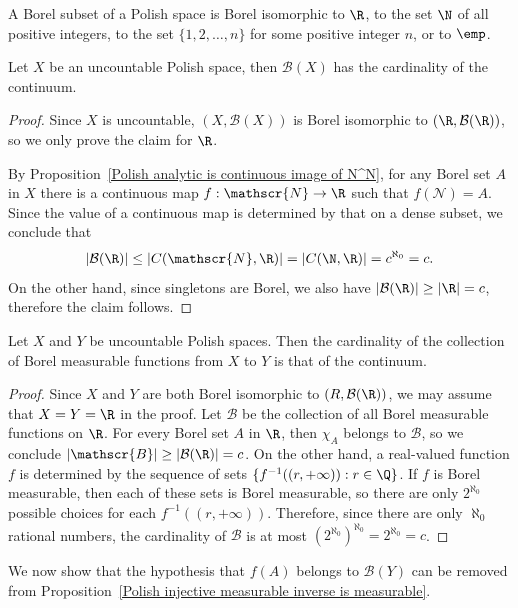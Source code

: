\begin{corollary}\label{Polish Borel set classification}
A Borel subset of a Polish space is Borel isomorphic to $\R$, to the set $\N$ of all positive integers, to the set $\{1,2,\dots,n\}$ for some positive integer $n$, or to $\emp$.
\end{corollary}
\begin{corollary}\label{Polish Borel algebra card}
Let $X$ be an uncountable Polish space, then $\mathcal{B}(X)$ has the cardinality of the continuum.
\end{corollary}
\begin{proof}
Since $X$ is uncountable, $(X,\mathcal{B}(X))$ is Borel isomorphic to $(\R,\mathcal{B}(\R))$, so we only prove the claim for $\R$.\par
By Proposition~\ref{Polish analytic is continuous image of N^N}, for any Borel set $A$ in $X$ there is a continuous map $f:\mathscr{N}\to\R$ such that $f(\mathscr{N})=A$. Since the value of a continuous map is determined by that on a dense subset, we conclude that
\[|\mathcal{B}(\R)|\leq|C(\mathscr{N},\R)|=|C(\N,\R)|=c^{\aleph_0}=c.\]
On the other hand, since singletons are Borel, we also have $|\mathcal{B}(\R)|\geq|\R|=c$, therefore the claim follows.
\end{proof}
\begin{corollary}\label{Polish uncountable spaces Borel measurable function card}
Let $X$ and $Y$ be uncountable Polish spaces. Then the cardinality of the collection of Borel measurable functions from $X$ to $Y$ is that of the continuum.
\end{corollary}
\begin{proof}
Since $X$ and $Y$ are both Borel isomorphic to $(R,\mathcal{B}(\R))$, we may assume that $X=Y=\R$ in the proof. Let $\mathscr{B}$ be the collection of all Borel measurable functions on $\R$. For every Borel set $A$ in $\R$, then $\chi_A$ belongs to $\mathscr{B}$, so we conclude $|\mathscr{B}|\geq|\mathcal{B}(\R)|=c$. On the other hand, a real-valued function $f$ is determined by the sequence of sets $\{f^{-1}((r,+\infty)):r\in\Q\}$. If $f$ is Borel measurable, then each of these sets is Borel measurable, so there are only $2^{\aleph_0}$ possible choices for each $f^{-1}((r,+\infty))$.  Therefore, since there are only $\aleph_0$ rational numbers, the cardinality of $\mathscr{B}$ is at most $(2^{\aleph_0})^{\aleph_0}=2^{\aleph_0}=c$.
\end{proof}
We now show that the hypothesis that $f(A)$ belongs to $\mathcal{B}(Y)$ can be removed from Proposition~\ref{Polish injective measurable inverse is measurable}.
